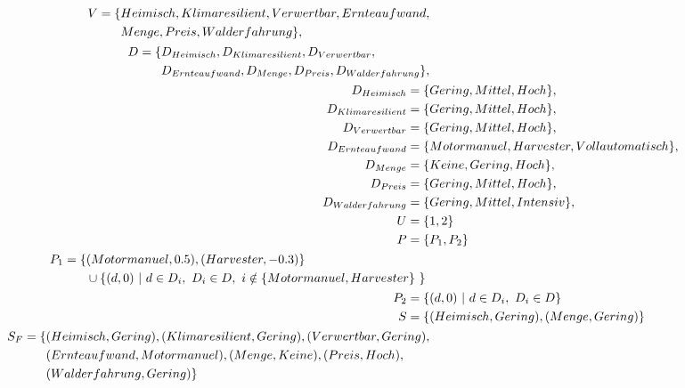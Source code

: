 \documentclass{article}
\begin{document}
\begin{mdframed}[frametitle={Forest Example}]
    \begin{align}
        \begin{split}
            V = \{ & Heimisch, Klimaresilient, Verwertbar, Ernteaufwand, \\
            & Menge, Preis, Walderfahrung \},
        \end{split} \notag \\
        \begin{split}
            D = \{ & D_{Heimisch}, D_{Klimaresilient}, D_{Verwertbar}, \\ 
            & D_{Ernteaufwand}, D_{Menge}, D_{Preis}, D_{Walderfahrung}\},
        \end{split} \notag \\
            D_{Heimisch} =  \{ & Gering, Mittel, Hoch\}, \notag \\
            D_{Klimaresilient} = \{ & Gering, Mittel, Hoch\}, \notag \\
            D_{Verwertbar} = \{ & Gering, Mittel, Hoch\}, \notag \\
            D_{Ernteaufwand} = \{ & Motormanuel, Harvester, Vollautomatisch\}, \notag \\
            D_{Menge} = \{ & Keine, Gering, Hoch\}, \notag \\
            D_{Preis} = \{ & Gering, Mittel, Hoch\}, \notag\\
            D_{Walderfahrung} = \{ & Gering, Mittel, Intensiv\},\notag \\
        U = \{ & 1,2\} \notag\\
        P = \{ & P_1, P_2\} \notag\\
        \begin{split}
            P_1 = \{ & (Motormanuel, 0.5), (Harvester, -0.3) \} \\ 
            & \cup \{ (d,0)\ |\ d \in D_i,\ D_i \in D,\ i \notin \{ Motormanuel, Harvester\} \ \} \ 
        \end{split} \notag \\
        P_2 = \{ & (d,0)\ |\ d \in D_i,\ D_i \in D \} \notag \\
        S  =  \{ & (Heimisch, Gering), (Menge, Gering) \} \notag \\
        \begin{split}
        S_F  =  \{ & (Heimisch, Gering), (Klimaresilient, Gering), (Verwertbar, Gering), \\
        & (Ernteaufwand, Motormanuel),
        (Menge, Keine), (Preis, Hoch),\\ 
        & (Walderfahrung, Gering) \} 
        \end{split} \notag
    \end{align}
\end{mdframed}
\end{document}
